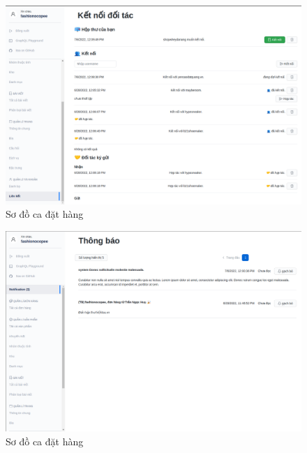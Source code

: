 \begin{figure}[h!]
	\begin{center}	
		\includegraphics[width=\textwidth]{./results/contract}
		\caption{Sơ đồ ca đặt hàng}
	\end{center}
\end{figure}


\begin{figure}[h!]
	\begin{center}	
		\includegraphics[width=\textwidth]{./results/notifications}
		\caption{Sơ đồ ca đặt hàng}
	\end{center}
\end{figure}

